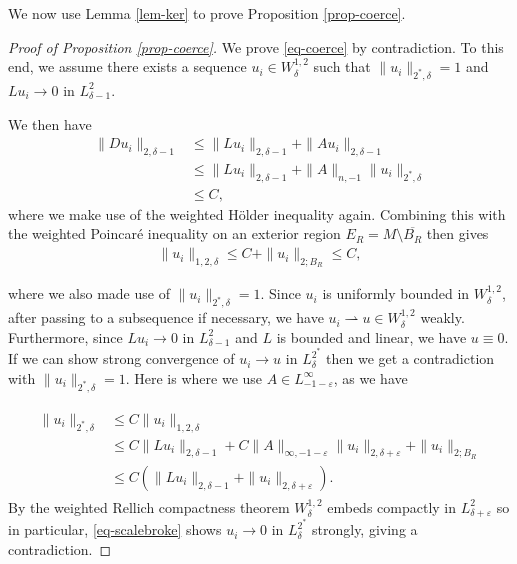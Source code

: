 \documentclass[a4paper,11pt,reqno]{amsart}
\theoremstyle{plain}
\theoremstyle{definition}
\theoremstyle{remark}
\numberwithin{equation}{section}
\begin{document}
We now use Lemma \ref{lem-ker} to prove Proposition \ref{prop-coerce}.
\begin{proof}[Proof of Proposition \ref{prop-coerce}]
	We prove \eqref{eq-coerce} by contradiction. To this end, we assume there exists a sequence $u_i\in W^{1,2}_\delta$ such that $\|u_i\|_{2^*,\delta}=1$ and $Lu_i\to0$ in $L^{2}_{\delta-1}$.
	
	We then have
	\begin{align}
		\| Du_i \|_{2,\delta-1}&\leq \|Lu_i\|_{2,\delta-1}+\|Au_i\|_{2,\delta-1}\nonumber \\
		&\leq \|Lu_i\|_{2,\delta-1}+\|A\|_{n,-1}\|u_i\|_{2^*,\delta}\\
		&\leq C,\nonumber
	\end{align}
	where we make use of the weighted H\"older inequality again. Combining this with the weighted Poincar\'e inequality on an exterior region $E_R=M\setminus \overline{B_R}$ then gives
	\begin{align*}
		\|u_i\|_{1,2,\delta}\leq C + \|u_i\|_{2;B_R}\leq C,
	\end{align*}
	
	where we also made use of $\|u_i\|_{2^*,\delta}=1$. Since $u_i$ is uniformly bounded in $W^{1,2}_\delta$, after passing to a subsequence if necessary, we have $u_i\rightharpoonup u\in W^{1,2}_\delta$ weakly. Furthermore, since $Lu_i\to 0$ in $L^{2}_{\delta-1}$ and $L$ is bounded and linear, we have $u\equiv0$. If we can show strong convergence of $u_i\to u$ in $L^{2^*}_\delta$ then we get a contradiction with $\|u_i\|_{2^*,\delta}=1$. Here is where we use $A\in L^\infty_{-1-\varepsilon}$, as we have
	
	\begin{align}\begin{split}
			\|u_i\|_{2^*,\delta}&\leq C \| u_i \|_{1,2,\delta}\\
			&\leq C\|Lu_i\|_{2,\delta-1}+C\|A\|_{\infty,-1-\varepsilon}\|u_i\|_{2,\delta+\varepsilon}+\|u_i\|_{2;B_R}\\
			&\leq C\left( \|Lu_i\|_{2,\delta-1}+\|u_i\|_{2,\delta+\varepsilon}\right).\label{eq-scalebroke}		\end{split}
	\end{align}
	By the weighted Rellich compactness theorem \cite[Lemma 2.1]{choquet1981elliptic} $W^{1,2}_\delta$ embeds compactly in $L^{2}_{\delta+\varepsilon}$ so in particular, \eqref{eq-scalebroke} shows $u_i\to 0$ in $L^{2^*}_\delta$ strongly, giving a contradiction.
	
\end{proof}
\end{document}
